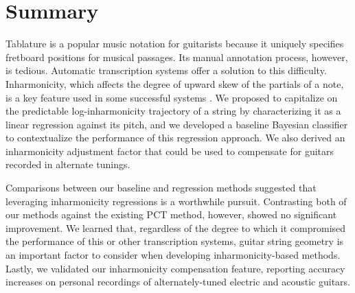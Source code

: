 \documentclass[convention,peer-reviewed]{aesconf}
\begin{document}
\section{Summary} 
Tablature is a popular music notation for guitarists because it uniquely specifies fretboard positions for musical passages. Its manual annotation process, however, is tedious. Automatic transcription systems offer a solution to this difficulty. Inharmonicity, which affects the degree of upward skew of the partials of a note, is a key feature used in some successful systems \citep{barbanchoi2012}. We proposed to capitalize on the predictable log-inharmonicity trajectory of a string by characterizing it as a linear regression against its pitch, and we developed a baseline Bayesian classifier to contextualize the performance of this regression approach. We also derived an inharmonicity adjustment factor that could be used to compensate for guitars recorded in alternate tunings.

Comparisons between our baseline and regression methods suggested that leveraging inharmonicity regressions is a worthwhile pursuit. Contrasting both of our methods against the existing PCT method, however, showed no significant improvement. We learned that, regardless of the degree to which it compromised the performance of this or other transcription systems, guitar string geometry is an important factor to consider when developing inharmonicity-based methods. Lastly, we validated our inharmonicity compensation feature, reporting accuracy increases on personal recordings of alternately-tuned electric and acoustic guitars.




\end{document}
